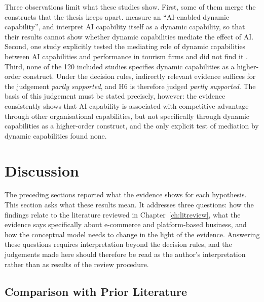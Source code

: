 Three observations limit what these studies show. First, some of them merge the constructs that the thesis keeps apart. \textcite{ayoub2026} measure an \enquote{AI-enabled dynamic capability}, and \textcite{shao2026} interpret AI capability itself as a dynamic capability, so that their results cannot show whether dynamic capabilities mediate the effect of AI. Second, one study explicitly tested the mediating role of dynamic capabilities between AI capabilities and performance in tourism firms and did not find it \parencite{kokash2026}. Third, none of the 120 included studies specifies dynamic capabilities as a higher-order construct. Under the decision rules, indirectly relevant evidence suffices for the judgement \textit{partly supported}, and H6 is therefore judged \textit{partly supported}. The basis of this judgement must be stated precisely, however: the evidence consistently shows that AI capability is associated with competitive advantage through other organisational capabilities, but not specifically through dynamic capabilities as a higher-order construct, and the only explicit test of mediation by dynamic capabilities found none.

\section{Discussion}
\label{sec:discussion}

The preceding sections reported what the evidence shows for each hypothesis. This section asks what these results mean. It addresses three questions: how the findings relate to the literature reviewed in Chapter~\ref{ch:litreview}, what the evidence says specifically about e-commerce and platform-based business, and how the conceptual model needs to change in the light of the evidence. Answering these questions requires interpretation beyond the decision rules, and the judgements made here should therefore be read as the author's interpretation rather than as results of the review procedure.

\subsection{Comparison with Prior Literature}
\label{sec:comparison}

